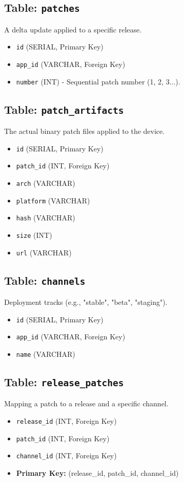 \documentclass[12pt,a4paper]{article}
\begin{document}
\subsection{Table: \texttt{patches}}
A delta update applied to a specific release.
\begin{itemize}
    \item \texttt{id} (SERIAL, Primary Key)
    \item \texttt{app\_id} (VARCHAR, Foreign Key)
    \item \texttt{number} (INT) - Sequential patch number (1, 2, 3...).
\end{itemize}

\subsection{Table: \texttt{patch\_artifacts}}
The actual binary patch files applied to the device.
\begin{itemize}
    \item \texttt{id} (SERIAL, Primary Key)
    \item \texttt{patch\_id} (INT, Foreign Key)
    \item \texttt{arch} (VARCHAR)
    \item \texttt{platform} (VARCHAR)
    \item \texttt{hash} (VARCHAR)
    \item \texttt{size} (INT)
    \item \texttt{url} (VARCHAR)
\end{itemize}

\subsection{Table: \texttt{channels}}
Deployment tracks (e.g., "stable", "beta", "staging").
\begin{itemize}
    \item \texttt{id} (SERIAL, Primary Key)
    \item \texttt{app\_id} (VARCHAR, Foreign Key)
    \item \texttt{name} (VARCHAR)
\end{itemize}

\subsection{Table: \texttt{release\_patches}}
Mapping a patch to a release and a specific channel.
\begin{itemize}
    \item \texttt{release\_id} (INT, Foreign Key)
    \item \texttt{patch\_id} (INT, Foreign Key)
    \item \texttt{channel\_id} (INT, Foreign Key)
    \item \textbf{Primary Key:} (release\_id, patch\_id, channel\_id)
\end{itemize}
\end{document}

